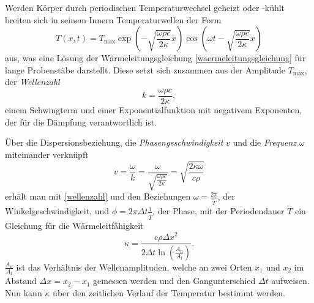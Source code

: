 Werden Körper durch periodischen Temperaturwechsel geheizt oder -kühlt breiten sich in seinem Innern Temperaturwellen der Form
\begin{equation}
	\label{temperaturwelle}
	T(x,t)= T_\mathup{max} \exp{\left(-\sqrt{\frac{\omega \rho c}{2\kappa}}x\right)} \cos{\left(\omega t - \sqrt{\frac{\omega \rho c}{2\kappa}}x\right)}
\end{equation}
aus, was eine Lösung der Wärmeleitungsgleichung \eqref{waermeleitungsgleichung} für lange Probenstäbe darstellt. Diese setzt sich zusammen aus der Amplitude $T_\text{max}$, der \emph{Wellenzahl} 
\begin{equation}
	\label{wellenzahl}
	k=\frac{\omega \rho c}{2\kappa} ,
\end{equation}
einem Schwingterm und einer Exponentialfunktion mit negativem Exponenten, der für die Dämpfung verantwortlich ist.

Über die Dispersionsbeziehung, die \emph{Phasengeschwindigkeit} $v$ und die \emph{Frequenz} $\omega$ miteinander verknüpft
\begin{equation}
	\label{dispersion}
	v=\frac{\omega}{k}=\frac{\omega}{\sqrt{\frac{\omega\rho c}{2\kappa}}}=\sqrt{\frac{2\kappa\omega}{c\rho}}
\end{equation}
erhält man mit \eqref{wellenzahl} und den Beziehungen $\omega=\frac{2\pi}{\tilde{T}}$, der Winkelgeschwindigkeit, und $\phi=2\pi\Delta{t}\frac{1}{\tilde{T}}$, der Phase, mit der Periodendauer $\tilde{T}$ ein Gleichung für die Wärmeleitfähigkeit
\begin{equation}
	\label{waermeleitfaehigkeit}
	\kappa=\frac{c\rho{\Delta{x}}^2}{2\Delta{t}\ln\left({\frac{A_\text{n}}{A_\text{f}}}\right)}.
\end{equation}
$\frac{A_\text{n}}{A_\text{f}}$ ist das Verhältnis der Wellenamplituden, welche an zwei Orten $x_1$ und $x_2$ im Abstand
$\Delta{x}=x_2-x_1$ gemessen werden und den Gangunterschied $\Delta{t}$ aufweisen. Nun kann $\kappa$ über den zeitlichen Verlauf der Temperatur bestimmt werden.



